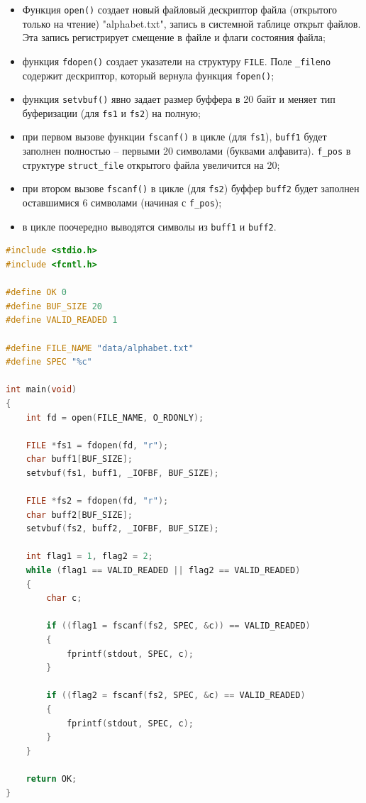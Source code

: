 \documentclass[12pt]{report}
\begin{document}
\begin{itemize}
	\item Функция \texttt{open()} создает новый файловый дескриптор файла (открытого только на чтение) "alphabet.txt", запись в системной таблице открыт файлов. Эта запись регистрирует смещение в файле и флаги состояния файла;
	
	\item функция \texttt{fdopen()} создает указатели на структуру \texttt{FILE}. Поле \texttt{\_fileno} содержит дескриптор, который вернула функция \texttt{fopen()};
	
	\item функция \texttt{setvbuf()} явно задает размер буффера в 20 байт и меняет тип буферизации (для \texttt{fs1} и \texttt{fs2}) на полную;
	
	\item при первом вызове функции \texttt{fscanf()} в цикле (для \texttt{fs1}), \texttt{buff1} будет заполнен полностью -- первыми 20 символами (буквами алфавита). \texttt{f\_pos} в структуре \texttt{struct\_file} открытого файла увеличится на 20;
	
	\item при втором вызове \texttt{fscanf()} в цикле (для \texttt{fs2}) буффер \texttt{buff2} будет заполнен оставшимися 6 символами (начиная с \texttt{f\_pos});
	
	\item в цикле поочередно выводятся символы из \texttt{buff1} и \texttt{buff2}.
\end{itemize}

\begin{lstlisting}[language=c, label=p1, caption=Программа №1]
#include <stdio.h>
#include <fcntl.h>

#define OK 0
#define BUF_SIZE 20
#define VALID_READED 1

#define FILE_NAME "data/alphabet.txt"
#define SPEC "%c"

int main(void)
{
	int fd = open(FILE_NAME, O_RDONLY);
	
	FILE *fs1 = fdopen(fd, "r");
	char buff1[BUF_SIZE];
	setvbuf(fs1, buff1, _IOFBF, BUF_SIZE);
	
	FILE *fs2 = fdopen(fd, "r");
	char buff2[BUF_SIZE];
	setvbuf(fs2, buff2, _IOFBF, BUF_SIZE);
	
	int flag1 = 1, flag2 = 2;
	while (flag1 == VALID_READED || flag2 == VALID_READED)
	{
		char c;
		
		if ((flag1 = fscanf(fs2, SPEC, &c)) == VALID_READED)
		{
			fprintf(stdout, SPEC, c);
		}
		
		if ((flag2 = fscanf(fs2, SPEC, &c) == VALID_READED)
		{
			fprintf(stdout, SPEC, c);
		}
	}
	
	return OK;
}
\end{lstlisting}
\end{document}
